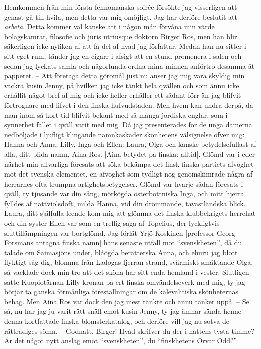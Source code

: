 Hemkommen från min första fennomanska soirée försökte jag visserligen
att genast gå till hvila, men detta var mig omöjligt. Jag har derföre
beslutit att \emph{arbeta}. Detta kommer väl kanske att i någon mån
förvåna min värde bolagskamrat, filosofie och juris utriusque doktorn
Birger Ros, men han blir säkerligen icke nyfiken af att få del af hvad
jag författar. Medan han nu sitter i sitt eget rum, tänder jag en cigarr
i afsigt att en stund promenera i salen och sedan jag lyckats samla och
någorlunda ordna mina minnen anförtro desamma åt papperet. -- Att
företaga detta göromål just nu anser jag mig vara skyldig min vackra
kusin Jenny, på hvilken jag icke tänkt hela qvällen och som ännu icke
erhållit något bref af mig och icke heller erhåller ett sådant förr än
jag blifvit förtrognare med lifvet i den finska hufvudstaden. Men hvem
kan undra derpå, då man inom så kort tid blifvit bekant med så många
jordiska englar, som i synnerhet fallet i qväll varit med mig. Då jag
presenterades för de unga damerna nedböljade i ljufligt klingande
namnkaskader skönhetens välsignelse öfver mig: Hanna och Anna; Lilly,
Inga och Ellen: Laura, Olga och kanske betydelsefullast af alla, ditt
blida namn, Aina Ros. {[}Aina betydet på finska: alltid{]}. Glömd var i
eder närhet min allvarliga föresats att söka bekämpa det finsk-finska
partiets afvoghet mot det svenska elementet, en afvoghet som tydligt nog
genomskimrade några af herrarnes ofta trumpna artighetsbetygelser. Glömd
var hvarje sådan föresats i qväll, ty tjusande var din sång, mörkögda
österbottniska Inga, och mitt hjerta fylldes af nattviolsdoft, milda
Hanna, vid din drömmande, tavastländska blick. Laura, ditt själfulla
leende kom mig att glömma det finska klubbekrigets herrehat och din
syster Ellen var som en treflig saga af Topelius, der lyckligtvis
sluttillämpningen var bortglömd. Jag förlät Yrjö Koskinen {[}professor
Georg Forsmans antagna finska namn{]} hans senaste utfall mot
``svenskheten'', då du talade om Saimasjöns under, blåögda berätterska
Anna, och ehuru jag blott flyktigt såg dig, blomma från Ladogas fjerran
strand, svärmiskt smäktande Olga, så vacklade dock min tro att det sköna
har sitt enda hemland i vester. Slutligen satte Kuopiotärnan Lilly
kronan på ert finska omvändelseverk med mig, ty jag börjar ta ganska
förmånliga föreställningar om de kalevalitiska skönheternas behag. Men
Aina Ros var dock den jag mest tänkte och ännu tänker uppå. -- Se så, nu
har jag ju varit rätt snäll emot kusin Jenny, ty jag ämnar sända henne
denna kortfattade finska blomsterkatalog, och derföre vill jag nu sotva
de rättrådiges sömn. -- Godnatt, Birger! Hvad skrifver du der i nattens
tysta timme? Är det något nytt anslag emot ``svenskheten'', du
``finskhetens Orvar Odd?''

